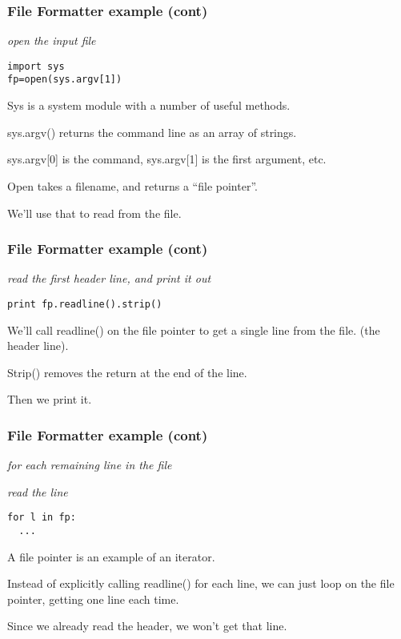 \documentclass[10pt]{beamer}
\begin{document}
\begin{frame}[fragile]
\frametitle{File Formatter example (cont)}

\textit{open the input file}

\begin{verbatim}
import sys
fp=open(sys.argv[1])
\end{verbatim}

Sys is a system module with a number of useful methods.  
\vspace{2mm}

sys.argv() returns the command line as an array of strings.  
\vspace{2mm}

sys.argv[0] is the command, sys.argv[1] is the first
argument, etc.
\vspace{2mm}

Open takes a filename, and returns a ``file pointer''.  
\vspace{2mm}

We'll use that to read from the file.

\end{frame}

\begin{frame}[fragile]
\frametitle{File Formatter example (cont)}

\textit{read the first header line, and print it out}

\begin{verbatim}
print fp.readline().strip()
\end{verbatim}

We'll call readline() on the file pointer to get a single line from the file.
(the header line).  
\vspace{2mm}

Strip() removes the return at the end of the line.
\vspace{2mm}

Then we print it.

\end{frame}

\begin{frame}[fragile]
\frametitle{File Formatter example (cont)}

\textit{for each remaining line in the file}

\textit{read the line}


\begin{verbatim}
for l in fp:
  ...
\end{verbatim}

A file pointer is an example of an iterator.  
\vspace{2mm}

Instead of explicitly calling readline() for each line, we can just loop on the file 
pointer, getting one line each time. 
\vspace{2mm}

Since we already read the header, we 
won't get that line.

\end{frame}
\end{document}
